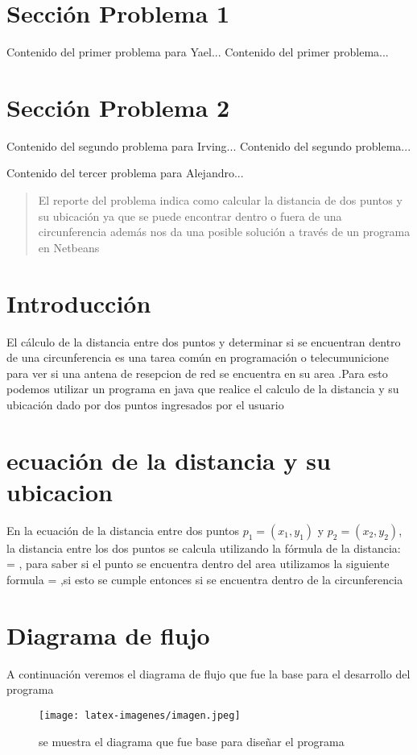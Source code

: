 \documentclass{IEEEcsmag}
\begin{document}
\section{Sección Problema 1}
Contenido del primer problema para Yael...
\newpage
Contenido del primer problema...
\newpage


\section{Sección Problema 2}
Contenido del segundo problema para Irving...
\newpage
Contenido del segundo problema...
\newpage


\subtitle {Problema 3:Cálculo de la distancia entre dos puntos en el área de una circunferencia}
Contenido del tercer problema para Alejandro...
\newpage 
\begin{abstract}
    
    El reporte del problema indica como calcular la distancia de dos puntos y su ubicación ya que se puede encontrar dentro o fuera de una circunferencia además nos da una posible solución a través de un programa en Netbeans
\end{abstract}





\section{Introducción}
El cálculo de la distancia entre dos puntos y determinar si se encuentran dentro de una circunferencia es una tarea común en programación o telecumunicione para ver si una antena de resepcion de red se encuentra en su area .Para esto podemos utilizar un programa en java que realice el calculo de la distancia y su ubicación dado por dos puntos ingresados por el usuario 
\section{ecuación de la distancia y su ubicacion}
En la ecuación de la distancia entre dos puntos $p_1 = (x_1, y_1)$ y $p_2 = (x_2, y_2)$, la distancia entre los dos puntos se calcula utilizando la fórmula de la distancia:
 = , para saber si el punto se encuentra dentro del area utilizamos la siguiente formula
 = ,si esto se cumple entonces si se encuentra dentro de la circunferencia



\section{Diagrama de flujo}
A continuación veremos el diagrama de flujo que fue la base para el desarrollo del programa
\begin{figure}[h!]
    \centering
    \texttt{[image: latex-imagenes/imagen.jpeg]}
    \caption{se muestra el diagrama que fue base para diseñar el programa}
    \label{fig:diagrama de flujo}
\end{figure}
\end{document}
